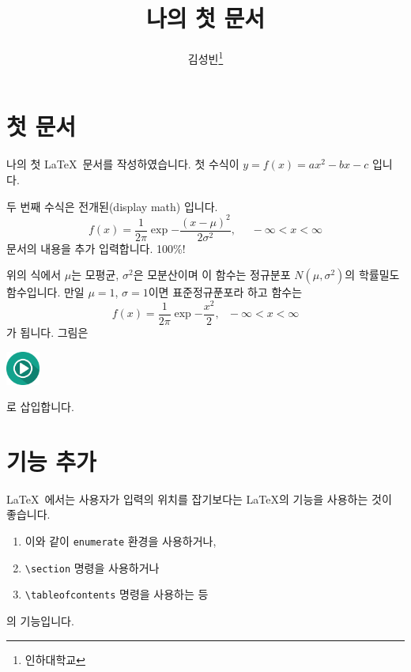 \documentclass[11pt]{article}
\title{나의 첫 문서}
\author{김성빈\thanks{인하대학교}}
\begin{document}
\maketitle
\tableofcontents
\section{첫 문서}
나의 첫 \LaTeX\ 문서를 작성하였습니다. 첫 수식이 $y=f(x)=ax^2-bx-c$ 입니다.

두 번째 수식은 전개된(display math) 입니다.
\begin{equation}
f(x) = \frac{1}{2\pi} \exp{-\frac{(x-\mu)^2}{2\sigma^2}}, \ \ \ \ \ \  -\infty < x < \infty
\end{equation}
문서의 내용을 추가 입력합니다. 100\%!

위의 식에서 $\mu$는 모평균, $\sigma^2$은 모분산이며 이 함수는 정규분포 $N(\mu, \sigma^2)$의 학률밀도함수입니다. 만일 $\mu=1$, $\sigma=1$이면 표준정규푼포라 하고 함수는
\begin{equation}
f(x)=\frac{1}{2\pi} \exp{-\frac{x^2}{2}}, \ \ \ -\infty < x < \infty
\end{equation}
가 됩니다. 그림은
\begin{center}
\includegraphics[width=3em]{../images/play.png}
\end{center}
로 삽입합니다.

\section{기능 추가}
\LaTeX\ 에서는 사용자가 입력의 위치를 잡기보다는 \LaTeX 의 기능을 사용하는 것이 좋습니다.
\begin{enumerate}
\item 이와 같이 \texttt{enumerate} 환경을 사용하거나,
\item \verb|\section| 명령을 사용하거나
\item \verb|\tableofcontents| 명령을 사용하는 등
\end{enumerate}
의 기능입니다.
\end{document}
